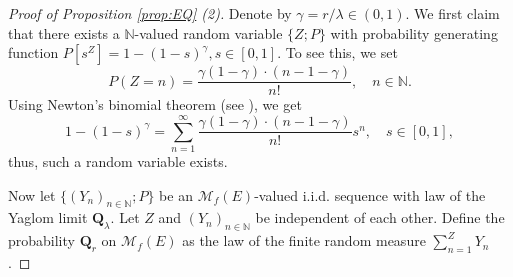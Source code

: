 \documentclass[12pt,a4paper]{amsart}
\numberwithin{equation}{section}
\theoremstyle{plain}
\theoremstyle{definition}
\theoremstyle{remark}
\begin{document}
\begin{proof}[Proof of Proposition \ref{prop:EQ} (2)]
	Denote by $\gamma = r / \lambda \in (0,1)$.
	We first claim that there exists a $\mathbb N$-valued random variable $\{Z;P\}$ with probability generating function $P[s^Z] = 1 - (1- s)^{\gamma}, s\in [0,1]$. To see this, we set
	\[
	P(Z = n) = \frac{\gamma(1-\gamma ) \cdot (n-1-\gamma  )}{n!}, \quad n \in \mathbb N.
	\]
	Using Newton's binomial theorem (see \cite[Exercise 8.22]{Rudin1976Principles}), we get
	\[
	1 - (1 - s)^\gamma = \sum_{n = 1}^\infty \frac{\gamma (1-\gamma)\cdot (n-1-\gamma )}{n!} s^n, \quad s\in [0,1],
	\]
thus, such a random variable exists.
	
	Now let $\{(Y_n)_{n \in \mathbb N}; P\}$ be an $\mathcal M_f(E)$-valued i.i.d. sequence with law of the Yaglom limit $\mathbf Q_\lambda$.
	Let $Z$ and $(Y_n)_{n\in \mathbb N}$ be independent of each other.
	Define the probability $\mathbf Q_r$ on $\mathcal M_f(E)$ as the law of the finite random measure $\sum_{n=1}^Z Y_n$.
	

\end{proof}
\end{document}
